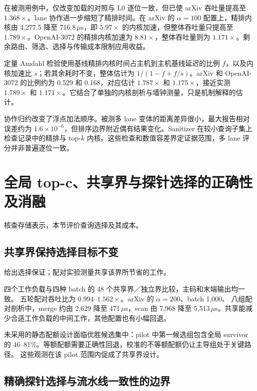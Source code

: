 在被测用例中，仅改变加载的对照与 L0 逐位一致，但已使 arXiv 吞吐量提高至 $1.368\times$。lane 协作进一步缩短了精排时间。在 arXiv 的 $\alpha=100$ 配置上，精排内核由 4,277.5 降至 716.8\,$\mu$s，即 $5.97\times$ 的内核加速，但整体吞吐量只提高至 $1.789\times$。OpenAI-3072 的精排内核加速为 $8.81\times$，整体吞吐量则为 $1.171\times$。剩余路由、筛选、选择与传输成本限制应用收益。

定量 Amdahl 检验使用基线精排内核时间占主机到主机基线延迟的比例 $f$，以及内核加速比 $s$；若其余耗时不变，整体估计为 $1/(1-f+f/s)$。arXiv 和 OpenAI-3072 的比例约为 0.529 和 0.168，对应估计 $1.787\times$ 和 $1.175\times$，接近实测 $1.789\times$ 和 $1.171\times$。它结合了单独的内核剖析与墙钟测量，只是机制解释的估计。

协作归约改变了浮点加法顺序。被测多 lane 变体的距离差异很小，最大报告相对误差约为 $1.6\times10^{-6}$，但排序边界附近偶有结果变化。Sanitizer 在较小查询子集上检查记录中的精排与 top-$k$ 内核。这些检查和数值容差界定证据范围，多 lane 评分并非普遍逐位一致。

\section{全局 top-c、共享界与探针选择的正确性及消融}
\label{sec:7-4}


核查存储表示，本节评价查询选择及其成本。




\subsection{共享界保持选择目标不变}

给出选择保证；配对实验测量共享该界所节省的工作。


四个工作负载与四种 batch 的 48 个共享界／独立界比较，主码和末端输出均一致。
五轮配对吞吐比为 $0.994$--$1.562\times$。arXiv 的 $\alpha=200$、batch 1,000、
八组配对剖析中，merge 约由 2,629 降至 471\,$\mu$s，scan 由 7,968 降至
5,513\,$\mu$s。共享能减少合适工作负载的中间工作，其他配置也有小幅回退。

未采用的静态配额设计面临优胜候选集中：pilot 中第一候选组包含全局 survivor 的
46--81\%。等额配额需要正确性回退，校准的不等额配额仍让主导组处于关键路径。
这些观测在该 pilot 范围内促成了共享界设计。

\subsection{精确探针选择与流水线一致性的边界}

